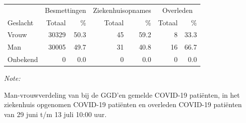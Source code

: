 \documentclass[
  english,
  man,floatsintext]{apa6}
\begin{document}
\begin{table}
\centering\begingroup\fontsize{11}{13}\selectfont

\begin{threeparttable}
\begin{tabular}{lrrrrrr}
\toprule
\multicolumn{1}{c}{ } & \multicolumn{2}{c}{Besmettingen} & \multicolumn{2}{c}{Ziekenhuisopnames} & \multicolumn{2}{c}{Overleden} \\
\cmidrule(l{3pt}r{3pt}){2-3} \cmidrule(l{3pt}r{3pt}){4-5} \cmidrule(l{3pt}r{3pt}){6-7}
Geslacht & Totaal & \% & Totaal & \% & Totaal & \%\\
\midrule
Vrouw & 30329 & 50.3 & 45 & 59.2 & 8 & 33.3\\
Man & 30005 & 49.7 & 31 & 40.8 & 16 & 66.7\\
Onbekend & 0 & 0.0 & 0 & 0.0 & 0 & 0.0\\
\bottomrule
\end{tabular}
\begin{tablenotes}
\item \textit{Note: } 
\item Man-vrouwverdeling van bij de GGD’en gemelde COVID-19 patiënten, in het ziekenhuis opgenomen COVID-19 patiënten en overleden COVID-19 patiënten van 29 juni t/m 13 juli 10:00 uur.
\end{tablenotes}
\end{threeparttable}
\endgroup{}
\end{table}
\newpage
\end{document}
